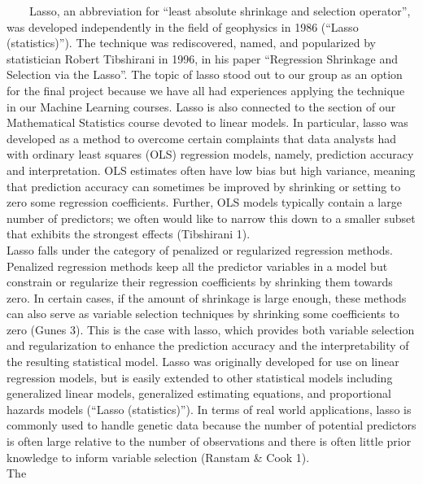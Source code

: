 \documentclass[
]{article}
\begin{document}
~~~~Lasso, an abbreviation for ``least absolute shrinkage and selection
operator'', was developed independently in the field of geophysics in
1986 (``Lasso (statistics)''). The technique was rediscovered, named,
and popularized by statistician Robert Tibshirani in 1996, in his paper
``Regression Shrinkage and Selection via the Lasso''. The topic of lasso
stood out to our group as an option for the final project because we
have all had experiences applying the technique in our Machine Learning
courses. Lasso is also connected to the section of our Mathematical
Statistics course devoted to linear models. In particular, lasso was
developed as a method to overcome certain complaints that data analysts
had with ordinary least squares (OLS) regression models, namely,
prediction accuracy and interpretation. OLS estimates often have low
bias but high variance, meaning that prediction accuracy can sometimes
be improved by shrinking or setting to zero some regression
coefficients. Further, OLS models typically contain a large number of
predictors; we often would like to narrow this down to a smaller subset
that exhibits the strongest effects (Tibshirani 1).\\
\hspace*{0.333em}\hspace*{0.333em}\hspace*{0.333em}\hspace*{0.333em}Lasso
falls under the category of penalized or regularized regression methods.
Penalized regression methods keep all the predictor variables in a model
but constrain or regularize their regression coefficients by shrinking
them towards zero. In certain cases, if the amount of shrinkage is large
enough, these methods can also serve as variable selection techniques by
shrinking some coefficients to zero (Gunes 3). This is the case with
lasso, which provides both variable selection and regularization to
enhance the prediction accuracy and the interpretability of the
resulting statistical model. Lasso was originally developed for use on
linear regression models, but is easily extended to other statistical
models including generalized linear models, generalized estimating
equations, and proportional hazards models (``Lasso (statistics)''). In
terms of real world applications, lasso is commonly used to handle
genetic data because the number of potential predictors is often large
relative to the number of observations and there is often little prior
knowledge to inform variable selection (Ranstam \& Cook 1).\\
\hspace*{0.333em}\hspace*{0.333em}\hspace*{0.333em}\hspace*{0.333em}The
\end{document}
